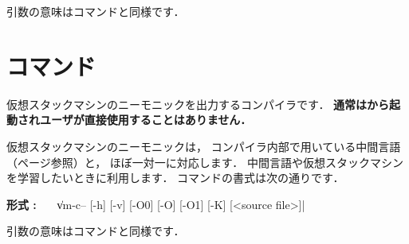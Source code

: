 引数の意味は{\cmmc}コマンドと同様です．

\section{{\vcmmc}コマンド}
\label{command:vcmmc}

仮想スタックマシンのニーモニックを出力する{\cmm}コンパイラです．
{\bf 通常は{\cmv}から起動されユーザが直接使用することはありません．}

仮想スタックマシンのニーモニックは，
コンパイラ内部で用いている中間言語（\pageref{app:vm}ページ参照）と，
ほぼ一対一に対応します．
中間言語や仮想スタックマシンを学習したいときに利用します．
{\vcmmc}コマンドの書式は次の通りです．

\begin{flushleft}
{\bf 形式 : }~~~\|vm-c-- [-h] [-v] [-O0] [-O] [-O1] [-K] [<source file>]|
\end{flushleft}

引数の意味は{\cmmc}コマンドと同様です．
%


